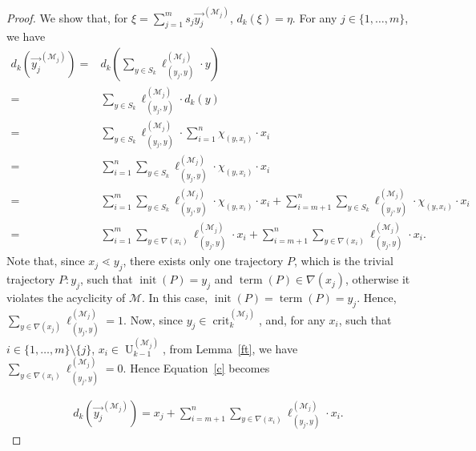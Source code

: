 \documentclass[10pt,a4paper]{amsart}
\newcommand{\M}{\mathcal{M}}
\newcommand{\crit}{\operatorname{crit}}
\newcommand{\up}{\operatorname{U}}
\begin{document}
\begin{proof}
     	We show that, for $\xi= \sum_{j=1}^m s_j\overrightarrow{y_j}^{(\M_j)}$, $d_k(\xi)=\eta$. For any $j\in\{1,\ldots,m\}$, we have
     	\begin{align} \label{c}
     		\nonumber	d_k (\overrightarrow{y_j}^{(\M_j)}) =&d_k(\sum_{y\in S_{k}}\ell^{(\M_j)}_{(y_j,y)}\cdot y)\\
     		\nonumber	= & \sum_{y\in S_{k}}\ell^{(\M_j)}_{(y_j,y)}\cdot d_k(y)\\
     		\nonumber	= &\sum_{y\in S_{k}}\ell^{(\M_j)}_{(y_j,y)}\cdot \sum_{i=1}^n \chi_{(y,x_i)} \cdot x_i\\
     		\nonumber	= & \sum_{i=1}^n\sum_{y\in S_{k}}\ell^{(\M_j)}_{(y_j,y)}\cdot \chi_{(y,x_i)} \cdot x_i\\
     	    \nonumber		= & \sum_{i=1}^m\sum_{y\in S_{k}}\ell^{(\M_j)}_{(y_j,y)}\cdot \chi_{(y,x_i)} \cdot x_i+ \sum_{i=m+1}^n\sum_{y\in S_{k}}\ell^{(\M_j)}_{(y_j,y)}\cdot \chi_{(y,x_i)} \cdot x_i\\
     	    		=& \sum_{i=1}^m \sum_{y\in \nabla(x_i)}\ell^{(\M_j)}_{(y_j,y)} \cdot x_i	+ \sum_{i=m+1}^n \sum_{y\in \nabla(x_i)}\ell^{(\M_j)}_{(y_j,y)} \cdot x_i.	
     	\end{align}
   Note that, since $x_j\lessdot y_j$, there exists only one trajectory $P$, which is the trivial trajectory $P: y_j$, such that $\operatorname{init}(P)=y_j$ and $\operatorname{term}(P)\in \nabla(x_j)$, otherwise it violates the acyclicity of $\M$. In this case, $\operatorname{init}(P)=\operatorname{term}(P)=y_j$. Hence, $\sum_{y\in \nabla(x_j)}\ell^{(\M_j)}_{(y_j,y)}=1$. Now, since $y_j \in \crit_k^{(\M_j)}$, and, for any $x_i$, such that $i\in \{1,\ldots,m\}\setminus \{j\}$,  $x_i\in \up_{k-1}^{(\M_j)}$, from Lemma~\ref{ft}, we have $\sum_{y\in \nabla(x_i)}\ell^{(\M_j)}_{(y_j,y)}=0$. Hence Equation~\eqref{c} becomes
     	
     	\begin{align}  \label{a} 
     		d_k (\overrightarrow{y_j}^{(\M_j)})	= x_j +   \sum_{i=m+1}^n \sum_{y\in \nabla(x_i)}\ell^{(\M_j)}_{(y_j,y)} \cdot x_i	.
     	\end{align}
 

\end{proof}
\end{document}
